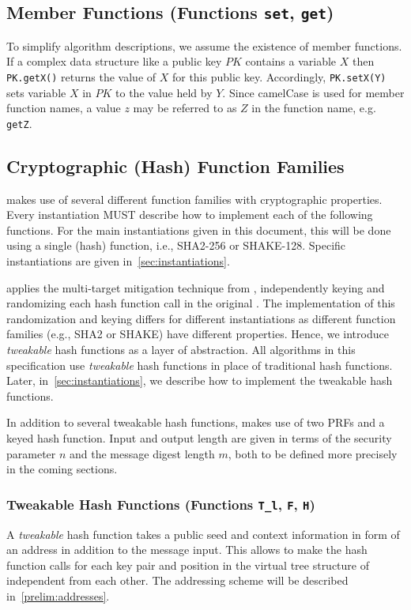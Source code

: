 \subsection{Member Functions (Functions \texttt{set}, \texttt{get})}\label{func:member}

   To simplify algorithm descriptions, we assume the existence of member
   functions.  If a complex data structure like a public key $PK$ contains
   a variable $X$ then \texttt{PK.getX()} returns the value of $X$ for this public key.
   Accordingly, \texttt{PK.setX(Y)} sets variable $X$ in $PK$ to the value held by
   $Y$.  Since camelCase is used for member function names, a value $z$ may
   be referred to as $Z$ in the function name, e.g.  \texttt{getZ}.

\subsection{Cryptographic (Hash) Function Families}
   \spx makes use of several different function families with cryptographic 
   properties. Every \spx instantiation MUST describe how to implement each of 
   the following functions. For the main instantiations given in this document, 
   this will be done using a single (hash) function, i.e., SHA2-256 or SHAKE-128.
   Specific instantiations are given in~\autoref{sec:instantiations}.
   
   \spx applies the multi-target mitigation technique from 
   \cite{Huelsing2016}, independently keying and randomizing each hash function 
   call in the original \spc. The implementation of this randomization and 
   keying differs for different instantiations as different function families  
   (e.g., SHA2 or SHAKE) have different properties. Hence, we introduce 
   \emph{tweakable} hash functions as a layer of abstraction. All algorithms in 
   this specification use \emph{tweakable} hash functions in place of traditional
   hash functions. Later, in~\autoref{sec:instantiations}, we describe how to 
   implement the tweakable hash functions.
   
   In addition to several tweakable hash functions, \spx makes use of two PRFs 
   and a keyed hash function. Input and output length are given in terms of the 
   security parameter $n$ and the message digest length $m$, both to be defined 
   more precisely in the coming sections.

\subsubsection{Tweakable Hash Functions (Functions \texttt{T\_l}, \texttt{F}, \texttt{H})}
   A \emph{tweakable} hash function takes a public seed \pseed and context 
   information in form of an address \adrs in addition to the message input. 
   This allows to make the hash function calls for each 
   key pair and position in the virtual tree structure of \spx independent from 
   each other. The addressing scheme will be described in~\autoref{prelim:addresses}.

